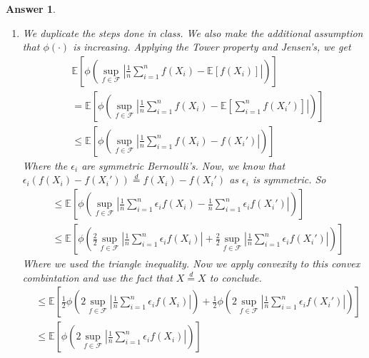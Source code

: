 \documentclass[12pt]{article}
\theoremstyle{colon}
\newtheorem*{answer}{Answer}
\begin{document}
\begin{answer}
\begin{enumerate}[label=\arabic*)]
    \item We duplicate the steps done in class. We also make the additional assumption that $\phi(\cdot)$ is increasing. Applying the Tower property and Jensen's, we get
      \begin{align*}
        &\mathbb{E} \left[ \phi \left( \sup_{f \in \mathcal{F}} \left\lvert \frac{1}{n} \sum_{i=1}^n f(X_i) - \mathbb{E}[f(X_i)] \right\rvert \right) \right] \\
        &= \mathbb{E} \left[ \phi \left( \sup_{f \in \mathcal{F}} \left\lvert \frac{1}{n} \sum_{i=1}^n f(X_i) - \mathbb{E}[ \sum_{i=1}^n f(X_i')] \right\rvert \right) \right] \\
        &\leq \mathbb{E} \left[ \phi \left( \sup_{f \in \mathcal{F}} \left\lvert \frac{1}{n} \sum_{i=1}^n f(X_i) - f(X_i') \right\rvert \right) \right]
      \end{align*}
      Where the $\epsilon_i$ are symmetric Bernoulli's. Now, we know that $\epsilon_i (f(X_i) - f(X_i')) \stackrel{d}{=} f(X_i) - f(X_i')$ as $\epsilon_i$ is symmetric. So
      \begin{align*}
        &\leq \mathbb{E} \left[ \phi \left( \sup_{f \in \mathcal{F}} \left\lvert \frac{1}{n} \sum_{i=1}^n \epsilon_i f(X_i) - \frac{1}{n} \sum_{i=1}^n \epsilon_i f(X_i') \right\rvert \right) \right] \\
        &\leq \mathbb{E} \left[ \phi \left( \frac{2}{2} \sup_{f \in \mathcal{F}} \left\lvert \frac{1}{n} \sum_{i=1}^n \epsilon_i f(X_i) \right\rvert + \frac{2}{2} \sup_{f \in \mathcal{F}} \left\lvert \frac{1}{n} \sum_{i=1}^n \epsilon_i f(X_i') \right\rvert \right) \right]
      \end{align*}
      Where we used the triangle inequality. Now we apply convexity to this convex combintation and use the fact that $X \stackrel{d}{=} X$ to conclude.
      \begin{align*}
        &\leq \mathbb{E} \left[ \frac{1}{2} \phi \left( 2 \sup_{f \in \mathcal{F}} \left\lvert \frac{1}{n} \sum_{i=1}^n \epsilon_i f(X_i) \right\rvert \right) + \frac{1}{2} \phi\left( 2 \sup_{f \in \mathcal{F}} \left\lvert \frac{1}{n} \sum_{i=1}^n \epsilon_i f(X_i') \right\rvert \right) \right] \\
        &\leq \mathbb{E} \left[ \phi \left( 2 \sup_{f \in \mathcal{F}} \left\lvert \frac{1}{n} \sum_{i=1}^n \epsilon_i f(X_i) \right\rvert \right) \right]
      \end{align*}


\end{enumerate}
\end{answer}
\end{document}
